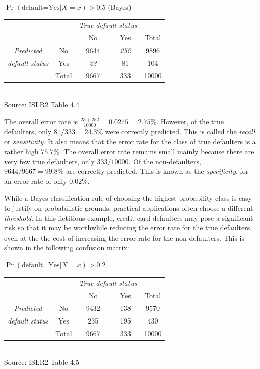 \begin{center}
\renewcommand{\arraystretch}{1.25}

$\Pr(\text{default=Yes} | X=x) > 0.5$ (Bayes) \\ \vspace{2mm}
\begin{tabular}{cc|cc|c} \hline
     & & \multicolumn{2}{c|}{\emph{True default status}} \\
     & & No & Yes & Total \\ \hline
\emph{Predicted} & No & 9644 & \emph{252} & 9896 \\ 
\emph{default status} & Yes & \emph{23} & 81 & 104 \\ \hline
     & Total & 9667 & 333 & 10000 \\ \hline
\end{tabular} \\
\vspace{\baselineskip}
\scriptsize Source: ISLR2 Table 4.4 \normalsize \\
\end{center}

The overall error rate is $\frac{23 + 252}{10000} = 0.0275 = 2.75\%$. However, of the true defaulters, only $81/333 = 24.3\%$ were correctly predicted. This is called the \emph{recall} or \emph{sensitivity}. It also means that the error rate for the class of true defaulters is a rather high $75.7\%$. The overall error rate remains small mainly because there are very few true defaulters, only $333/10000$. Of the non-defaulters, $9644/9667=99.8\%$ are correctly predicted. This is known as the \emph{specificity}, for an error rate of only $0.02\%$.

While a Bayes classification rule of choosing the highest probability class is easy to justify on probabilistic grounds, practical applications often choose a different \emph{threshold}. In this fictitious example, credit card defaulters may pose a significant risk so that it may be worthwhile reducing the error rate for the true defaulters, even at the the cost of increasing the error rate for the non-defaulters. This is shown in the following confusion matrix:

\begin{center}
\renewcommand{\arraystretch}{1.25}

$\Pr(\text{default=Yes} | X=x) > 0.2$ \\ \vspace{2mm}
\begin{tabular}{cc|cc|c} \hline
     & & \multicolumn{2}{c|}{\emph{True default status}} \\
     & & No & Yes & Total \\ \hline
\emph{Predicted} & No & 9432 & 138 & 9570 \\ 
\emph{default status} & Yes & 235 & 195 & 430 \\ \hline
     & Total & 9667 & 333 & 10000 \\ \hline
\end{tabular} \\
\vspace{\baselineskip}
\scriptsize Source: ISLR2 Table 4.5 \normalsize \\
\end{center}

